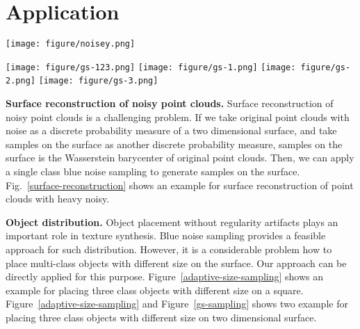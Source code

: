 \section{Application}

\begin{figure*}[htb]
  \centering
 
  \texttt{[image: figure/noisey.png]}
  \caption{Surface reconstruction of noisy point clouds. 
  The number of original noisy points is $8856$.
  The number of samples is $3946$. }\label{surface-reconstruction}
\end{figure*}

\begin{figure*}[htb]
  \centering
   \begin{minipage}{1\textwidth}
  \texttt{[image: figure/gs-123.png]}
  \texttt{[image: figure/gs-1.png]}
  \texttt{[image: figure/gs-2.png]}
  \texttt{[image: figure/gs-3.png]}
  \end{minipage}
  \caption{Object placement on a complex geometry model.
  The number of samples of each class is $200$, $1000$ and $1000$.}\label{gs-sampling}
\end{figure*}


\textbf{Surface reconstruction of noisy point clouds.}
Surface reconstruction of noisy point clouds is a challenging problem.
If we take original point clouds with noise as a discrete probability measure of a two dimensional surface,
and take samples on the surface as another discrete probability measure,
samples on the surface is the Wasserstein barycenter of original point clouds.
Then,
we can apply a single class blue noise sampling to generate samples on the surface.
Fig.~\ref{surface-reconstruction} shows an example for surface reconstruction of point clouds with heavy noisy.

\textbf{Object distribution.}
Object placement without regularity artifacts plays an important role in texture synthesis.
Blue noise sampling provides a feasible approach for such distribution.
However,
it is a considerable problem how to place multi-class objects with different size on the surface.
Our approach can be directly applied for this purpose.
Figure~\ref{adaptive-size-sampling} shows an example for placing three class objects with different size on a square.
Figure~\ref{adaptive-size-sampling} and Figure~\ref{gs-sampling} shows two example for placing three class objects with different size on two dimensional surface.

